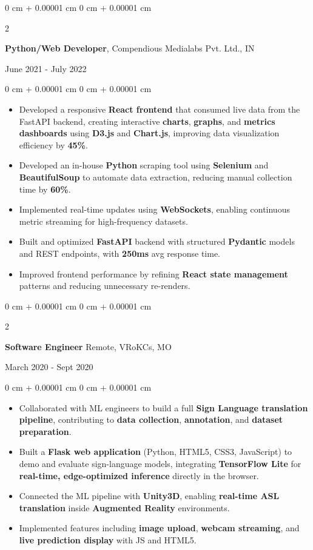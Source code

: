 \documentclass[10pt, letterpaper]{article}
\newenvironment{highlights}{
    \begin{itemize}[
        topsep=0.10 cm,
        parsep=0.10 cm,
        partopsep=0pt,
        itemsep=0pt,
        leftmargin=0 cm + 10pt
    ]
}{
    \end{itemize}
} %
\newenvironment{onecolentry}{
    \begin{adjustwidth}{
        0 cm + 0.00001 cm
    }{
        0 cm + 0.00001 cm
    }
}{
    \end{adjustwidth}
} %
\newenvironment{twocolentry}[2][]{
    \onecolentry
    \def\secondColumn{#2}
    \setcolumnwidth{\fill, 4.5 cm}
    \begin{paracol}{2}
}{
    \switchcolumn \raggedleft \secondColumn
    \end{paracol}
    \endonecolentry
} %
\begin{document}
\vspace{0.15 cm}
\begin{twocolentry}{
	June 2021 - July 2022
}
\textbf{Python/Web Developer}, Compendious Medialabs Pvt. Ltd., IN
\end{twocolentry}

\begin{onecolentry}
\begin{highlights}
	\item Developed a responsive \textbf{React frontend} that consumed live data from the FastAPI backend, creating interactive \textbf{charts}, \textbf{graphs}, and \textbf{metrics dashboards} using \textbf{D3.js} and \textbf{Chart.js}, improving data visualization efficiency by \textbf{45\%}.
	\item Developed an in-house \textbf{Python} scraping tool using \textbf{Selenium} and \textbf{BeautifulSoup} to automate data extraction, reducing manual collection time by \textbf{60\%}.
	\item Implemented real-time updates using \textbf{WebSockets}, enabling continuous metric streaming for high-frequency datasets.
	\item Built and optimized \textbf{FastAPI} backend with structured \textbf{Pydantic} models and REST endpoints, with \textbf{250ms} avg response time.
	\item Improved frontend performance by refining \textbf{React state management} patterns and reducing unnecessary re-renders.
\end{highlights}
\end{onecolentry}






\vspace{0.15 cm}
\begin{twocolentry}{
	March 2020 - Sept 2020
}
\textbf{Software Engineer} Remote, VRoKCs, MO
\end{twocolentry}
\begin{onecolentry}
\begin{highlights}
	\item Collaborated with ML engineers to build a full \textbf{Sign Language translation pipeline}, contributing to \textbf{data collection}, \textbf{annotation}, and \textbf{dataset preparation}.
	\item Built a \textbf{Flask web application} (Python, HTML5, CSS3, JavaScript) to demo and evaluate sign-language models, integrating \textbf{TensorFlow Lite} for \textbf{real-time, edge-optimized inference} directly in the browser.
	\item Connected the ML pipeline with \textbf{Unity3D}, enabling \textbf{real-time ASL translation} inside \textbf{Augmented Reality} environments.
	\item Implemented features including \textbf{image upload}, \textbf{webcam streaming}, and \textbf{live prediction display} with JS and HTML5.
\end{highlights}
\end{onecolentry}
\end{document}
